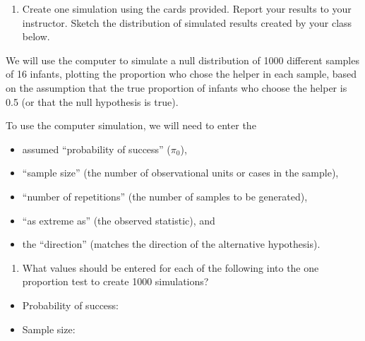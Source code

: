 \documentclass[
]{report}
\providecommand{\tightlist}{%
  \setlength{\itemsep}{0pt}\setlength{\parskip}{0pt}}
\begin{document}
\vspace{0.8in}

\begin{enumerate}
\def\labelenumi{\arabic{enumi}.}
\setcounter{enumi}{16}
\tightlist
\item
  Create one simulation using the cards provided. Report your results to your instructor. Sketch the distribution of simulated results created by your class below.
\end{enumerate}

\vspace{1.5in}

We will use the computer to simulate a null distribution of 1000 different samples of 16 infants, plotting the proportion who chose the helper in each sample, based on the assumption that the true proportion of infants who choose the helper is 0.5 (or that the null hypothesis is true).

To use the computer simulation, we will need to enter the

\begin{itemize}
\tightlist
\item
  assumed ``probability of success'' (\(\pi_0\)),
\item
  ``sample size'' (the number of observational units or cases in the sample),
\item
  ``number of repetitions'' (the number of samples to be generated),
\item
  ``as extreme as'' (the observed statistic), and
\item
  the ``direction'' (matches the direction of the alternative hypothesis).
\end{itemize}

\begin{enumerate}
\def\labelenumi{\arabic{enumi}.}
\setcounter{enumi}{17}
\tightlist
\item
  What values should be entered for each of the following into the one proportion test to create 1000 simulations?
\end{enumerate}

\vspace{1mm}

\begin{itemize}
\tightlist
\item
  Probability of success:
\end{itemize}

\vspace{.2in}

\begin{itemize}
\tightlist
\item
  Sample size:
\end{itemize}
\end{document}
